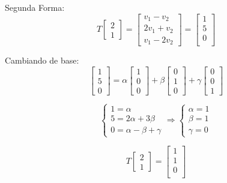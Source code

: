 \documentclass[12pt]{article}
\begin{document}
     Segunda Forma:\\
        \[T\left[\begin{array}{c}
            2\\
            1
        \end{array}\right]=\left[\begin{array}{c}
            v_{1}-v_{2}\\
            2v_{1}+v_{2}\\
            v_{1}-2v_{2}
        \end{array}\right]=\left[\begin{array}{c}
            1\\
            5\\
            0\\
        \end{array}\right]\]
        
    Cambiando de base:\\
    
\[\left[\begin{array}{c}
1\\
5\\
0
\end{array}\right]=\alpha\left[\begin{array}{c}
1\\
0\\
0
\end{array}\right]+\beta\left[\begin{array}{c}
0\\
1\\
0
\end{array}\right]+\gamma\left[\begin{array}{c}
0\\
0\\
1
\end{array}\right]\]

\[\left\{ \begin{array}{c}
1=\alpha\\
5=2\alpha+3\beta\\
0=\alpha-\beta+\gamma
\end{array}\Rightarrow\left\{ \begin{array}{c}
\alpha=1\\
\beta=1\\
\gamma=0
\end{array}\right.\right.\]

\[T\left[\begin{array}{c}
        2\\
        1
    \end{array}\right]=\left[\begin{array}{c}
        1\\
        1\\
        0\\
\end{array}\right]\]
\end{document}
